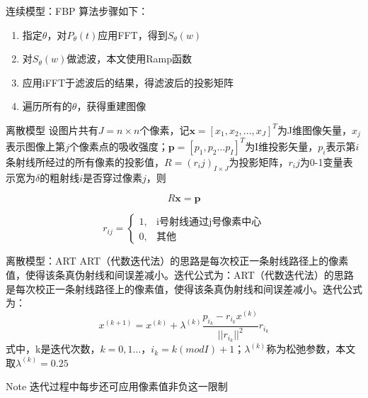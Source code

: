 \documentclass{beamer} %
\begin{document}
  
  
\begin{frame}{连续模型：FBP} 
	算法步骤如下：  
	\begin{enumerate}
		\item 指定$\theta$，对\(P_\theta (t)\)应用FFT，得到\(S_\theta (w)\)        
		\item 对\(S_\theta (w)\)做滤波，本文使用Ramp函数       
		\item 应用iFFT于滤波后的结果，得滤波后的投影矩阵     
		\item 遍历所有的$\theta$，获得重建图像 
	\end{enumerate}
\end{frame}

\begin{frame}{离散模型}  
	设图片共有\(J = n\times n\)个像素，记$\textbf{x}=[x_{1},x_{2} ,\ldots ,x_{J}]^T$为J维图像矢量，\(x_j\)表示图像上第\(j\)个像素点的吸收强度；$\textbf{p}=[p_{1},p_{2} \ldots p_{I}]^T$为I维投影矢量，$p_i$表示第\(i\)条射线所经过的所有像素的投影值，$R=(r_ij)_{I\times J}$为投影矩阵，\(r_ij\)为0-1变量表示宽为\(\delta\)的粗射线\(i\)是否穿过像素\(j\)，则	  
	

	\begin{equation}
		R\textbf{x}=\textbf{p}
	\end{equation}

	\[r_{ij}=
	\begin{cases}
	1 ,& \text{i号射线通过j号像素中心}\\
	0 ,& \text{其他}
	\end{cases}\]
\end{frame}
  
  
  
\begin{frame}{离散模型：ART}
	ART（代数迭代法）的思路是每次校正一条射线路径上的像素值，使得该条真伪射线和间误差减小。迭代公式为：ART（代数迭代法）的思路是每次校正一条射线路径上的像素值，使得该条真伪射线和间误差减小。迭代公式为：
	\begin{equation}
		x^{(k+1)}=x^{(k)}+\lambda^{(k)}\frac{p_{i_{k}}-r_{i_{k}}x^{(k)}}{||r_{i_{k}}||^{2}}r_{i_{k}}
	\end{equation}
	式中，k是迭代次数，$k=0,1 \ldots$，$i_{k}=k(modI)+1$；$\lambda^{(k)}$称为松弛参数，本文取$\lambda^{(k)}=0.25$
	\begin{alertblock}{Note}
		迭代过程中每步还可应用像素值非负这一限制
	\end{alertblock}
\end{frame}
  
\end{document}
